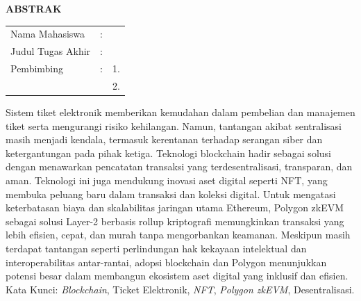 \begin{center}
  \large\textbf{ABSTRAK}
\end{center}


\vspace{2ex}

\begingroup
\setlength{\tabcolsep}{0pt}

\noindent
\begin{tabularx}{\textwidth}{l >{\centering}m{2em} X}
  Nama Mahasiswa    & : & \name{}       \\

  Judul Tugas Akhir & : & \tatitle{}    \\

  Pembimbing        & : & 1. \advisor{} \\ & & 2. \coadvisor{} \\
\end{tabularx}
\endgroup

Sistem tiket elektronik memberikan kemudahan dalam pembelian dan manajemen
tiket serta mengurangi risiko kehilangan. Namun, tantangan akibat sentralisasi
masih menjadi kendala, termasuk kerentanan terhadap serangan siber dan
ketergantungan pada pihak ketiga. Teknologi blockchain hadir sebagai solusi
dengan menawarkan pencatatan transaksi yang terdesentralisasi, transparan, dan
aman. Teknologi ini juga mendukung inovasi aset digital seperti NFT, yang
membuka peluang baru dalam transaksi dan koleksi digital. Untuk mengatasi
keterbatasan biaya dan skalabilitas jaringan utama Ethereum, Polygon zkEVM
sebagai solusi Layer-2 berbasis rollup kriptografi memungkinkan transaksi yang
lebih efisien, cepat, dan murah tanpa mengorbankan keamanan. Meskipun masih
terdapat tantangan seperti perlindungan hak kekayaan intelektual dan
interoperabilitas antar-rantai, adopsi blockchain dan Polygon menunjukkan
potensi besar dalam membangun ekosistem aset digital yang inklusif dan efisien.
Kata Kunci: \emph{Blockchain}, Ticket Elektronik, \emph{NFT}, \emph{Polygon
  zkEVM}, Desentralisasi.
